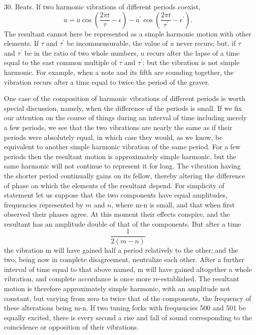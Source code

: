 30.  Beats.  If two harmonic vibrations of different periods coexist,
\[
u= a \cos \left(\frac{2 \pi t}{\tau}-\epsilon\right)-
a^{\prime} \cos \left(\frac{2 \pi t}{\tau^{\prime}}-\epsilon^{\prime}\right).
\]
The resultant cannot here
be represented as a simple harmonic motion with other elements.  If \(\tau \)
and \( \tau^{\prime}\) be incommensurable, the value of \(u\) never recurs;
but, if \( \tau \) and \( \tau^{\prime} \) be in the ratio of two whole
numbers, \(u\) recurs after the lapse of a time equal to the east common
multiple of \( \tau \) and \( \tau^{\prime} \); but the vibration is not simple
harmonic.  For example, when a note and its fifth are sounding together, the
vibration recurs after a time equal to twice the period of the graver.

One case of the composition of harmonic vibrations of different periods is
worth special discussion, namely, when the difference of the periods is small.
If we fix our attention on the course of things during an interval of time
including merely a few periods, we see that the two vibrations are nearly the
same as if their periods were absolutely equal, in which case they would, as we
know, be equivalent to another simple harmonic vibration of the same period.
For a few periods then the resultant motion is approximately simple harmonic,
but the same harmonic will not continue to represent it for long. The vibration
having the shorter period continually gains on its fellow, thereby altering the
difference of phase on which the elements of the resultant depend. For
simplicity of statement let us suppose that the two components have equal
amplitudes, frequencies represented by \(m\) and \(n\), where m-n is small, and
that when first observed their phases agree.  At this moment their effects
conspire, and the resultant has an amplitude double of that of the components.
But after a time
\[ \frac{1}{ 2(m-n) } \]
the vibration m will have gained half
a period relatively to the other;.and the two, being now in complete
disagreement, neutralize each other. After a further interval of time equal to
that above named, m will have gained altogether a whole vibration, and complete
accordance is once more re-established. The resultant motion is therefore
approximately simple harmonic, with an amplitude not constant, but varying from
zero to twice that of the components, the frequency of these alterations being
m-n. If two tuning forks with frequencies 500 and 501 be equally excited, there
is every second a rise and fall of sound corresponding to the coincidence or
opposition of their vibrations.

